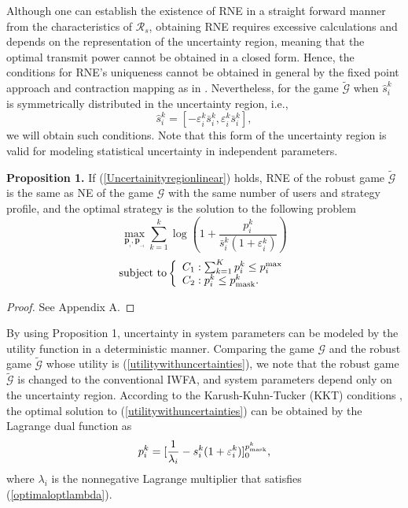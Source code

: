 \documentclass[peerreview,onecolumn,11pt,draftclsnofoot]{IEEEtran}\usepackage{amsmath}\usepackage{amsfonts}\usepackage{epsfig}\usepackage{amssymb}\usepackage{graphicx}\usepackage{amssymb,amsmath}\usepackage{cite}\usepackage{color,soul}\newcommand\T{\rule{0pt}{3.1ex}}
\begin{document}
Although one can establish the existence of RNE in a straight forward manner from the characteristics of $\mathcal{R}_s$, obtaining RNE requires excessive calculations and depends on the representation of the uncertainty region, meaning that the optimal transmit power cannot be obtained in a closed form. Hence, the conditions for RNE's uniqueness cannot be obtained in general by the fixed point approach and contraction mapping as in \cite{Nash1,Nash2}. Nevertheless, for the game $\widetilde{\mathcal{G}}$ when $\hat{s}^{k}_{i}$  is symmetrically distributed in the uncertainty region, i.e.,
\begin{equation}\label{Uncertainityregionlinear}
\hat{s}^{k}_{i}=[-\varepsilon^{k}_{i}\bar{s}^{k}_{i},\varepsilon^{k}_{i}
\bar{s}^{k}_{i}],
\end{equation}
we will obtain such conditions. Note that this form of the uncertainty region is valid for modeling statistical uncertainty in independent parameters.

\textbf{Proposition 1.} If (\ref{Uncertainityregionlinear}) holds, RNE of the robust game $\widetilde{\mathcal{G}}$ is the same as NE of the game $\mathcal{G}$ with the same number of users and strategy profile, and the optimal strategy is the solution to the following problem
\begin{equation}\label{utilitywithuncertainties}
\max_{\mathbf{p}_{_{i}}, \mathbf{p}_{_{-i}}}
\sum_{k=1}^{k}\log(1+\frac{p^{k}_{i}}{\bar{s}^{k}_{i}(1+\varepsilon^{k}_{i})})
\end{equation}
\[\mathrm{subject~to} \left\{
\begin{array}{l l}
C_1: \sum_{k=1}^{K} p^{k}_{i} \leq  p_{i}^{\scriptsize{\textnormal{max}}} \nonumber \\
C_2: p^{k}_{i}\leq  p^{k}_{\scriptsize{\textnormal{mask}}}. \nonumber \\
\end{array} \right. \]
\begin{proof}
See Appendix A.
\end{proof}
By using Proposition 1, uncertainty in system parameters can be modeled by the utility function in a deterministic manner.
Comparing the game $\mathcal{G}$ and the robust game $\widetilde{\mathcal{G}}$ whose utility is (\ref{utilitywithuncertainties}), we note that the robust game $\widetilde{\mathcal{G}}$ is changed to the conventional IWFA, and system parameters depend only on the uncertainty region. According to the Karush-Kuhn-Tucker (KKT) conditions \cite{boydconvexbook}, the optimal solution to (\ref{utilitywithuncertainties}) can be obtained by the Lagrange dual function as
\begin{equation}\label{optimalopt1robustgame}
    p_{i}^{k}=[\frac{1}{\lambda_{i}}-s_{i}^{k}(1+\varepsilon_{i}^{k})]_{0}^{p^{k}_{\scriptsize{\textnormal{mask}}}},
\end{equation}
where $\lambda_i$ is the
nonnegative Lagrange multiplier that satisfies
(\ref{optimaloptlambda}).
\end{document}
